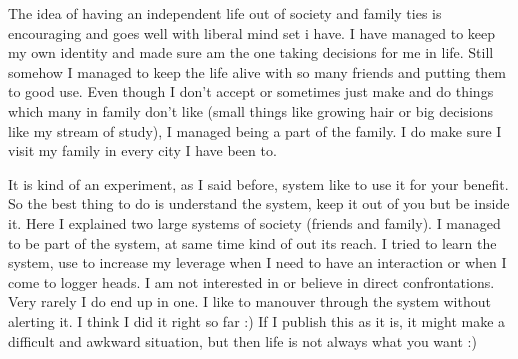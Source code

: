 The idea of having an independent life out of society and family ties is encouraging and goes 
well with liberal mind set i have. I have managed to keep my own identity and made sure am the 
one taking decisions for me in life. Still somehow I managed to keep the life alive with so many 
friends and putting them to good use. Even though I don't accept or sometimes just make and do 
things which many in family don't like (small things like growing hair or big decisions like my 
stream of study), I managed being a part of the family. I do make sure I visit my family in every 
city I have been to. 

It is kind of an experiment, as I said before, system like to use it for your benefit. So the best 
thing to do is understand the system, keep it out of you but be inside it. Here I explained two 
large systems of society (friends and family). I managed to be part of the system, at same time 
kind of out its reach. I tried to learn the system, use to increase my leverage when I need to have 
an interaction or when I come to logger heads. I am not interested in or believe in direct
confrontations. Very rarely I do end up in one. I like to manouver through the system without 
alerting it. I think I did it right so far :) If I publish this as it is, it might make a difficult 
and awkward situation, but then life is not always what you want :)

\newpage 
